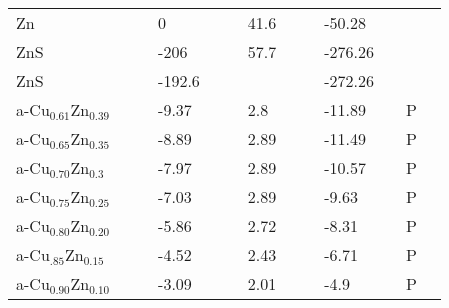 \documentclass{article}
\begin{document}
\begin{center}
\begin{longtable}{|l|p{2.5cm}|l|p{2.5cm}|l|l|p{2.5cm}|l|l|p{2.5cm}|l|l|l|}
Zn                          &            &                     & 0       &  & \citep{Haynes2013}                           & 41.6   &  & \citep{Haynes2013}                           & -50.28  &  & \citep{Barin1977}  \\
ZnS                         &            &                     & -206    &  & \citep{Haynes2013}                           & 57.7   &  & \citep{Haynes2013}                           & -276.26 &  & \citep{Haynes2013} \\
ZnS                         &            &                     & -192.6  &  & \citep{Haynes2013}                           &        &  &                                                & -272.26 &  & \citep{Haynes2013} \\
a-Cu$_{0.61}$Zn$_{0.39}$    &            &                     & -9.37   &  & \citep{KubaschewskiCatterallJohnAshley.1956} & 2.8    &  & \citep{KubaschewskiCatterallJohnAshley.1956} & -11.89  &  & P                    \\
a-Cu$_{0.65}$Zn$_{0.35}$    &            &                     & -8.89   &  & \citep{KubaschewskiCatterallJohnAshley.1956} & 2.89   &  & \citep{KubaschewskiCatterallJohnAshley.1956} & -11.49  &  & P                    \\
a-Cu$_{0.70}$Zn$_{0.3}$     &            &                     & -7.97   &  & \citep{KubaschewskiCatterallJohnAshley.1956} & 2.89   &  & \citep{KubaschewskiCatterallJohnAshley.1956} & -10.57  &  & P                    \\
a-Cu$_{0.75}$Zn$_{0.25}$    &            &                     & -7.03   &  & \citep{KubaschewskiCatterallJohnAshley.1956} & 2.89   &  & \citep{KubaschewskiCatterallJohnAshley.1956} & -9.63   &  & P                    \\
a-Cu$_{0.80}$Zn$_{0.20}$    &            &                     & -5.86   &  & \citep{KubaschewskiCatterallJohnAshley.1956} & 2.72   &  & \citep{KubaschewskiCatterallJohnAshley.1956} & -8.31   &  & P                    \\
a-Cu$_{.85}$Zn$_{0.15 }$    &            &                     & -4.52   &  & \citep{KubaschewskiCatterallJohnAshley.1956} & 2.43   &  & \citep{KubaschewskiCatterallJohnAshley.1956} & -6.71   &  & P                    \\
a-Cu$_{0.90}$Zn$_{0.10 }$   &            &                     & -3.09   &  & \citep{KubaschewskiCatterallJohnAshley.1956} & 2.01   &  & \citep{KubaschewskiCatterallJohnAshley.1956} & -4.9    &  & P                    \\

\end{longtable}
\end{center}
\end{document}
